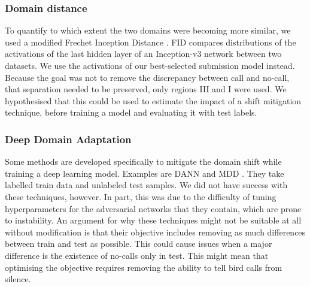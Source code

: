 \subsubsection{Domain distance}\label{sec:dist}
To quantify to which extent the two domains were becoming more similar, we used a modified Frechet Inception Distance \cite{heusel2018gans}. FID compares distributions of the activations of the last hidden layer of an Inception-v3 network between two datasets. We use the activations of our best-selected submission model instead. Because the goal was not to remove the discrepancy between call and no-call, that separation needed to be preserved, only regions III and I were used. We hypothesised that this could be used to estimate the impact of a shift mitigation technique, before training a model and evaluating it with test labels.

\subsubsection{Deep Domain Adaptation}
Some methods are developed specifically to mitigate the domain shift while training a deep learning model. Examples are DANN \cite{sicilia2022domain} and MDD \cite{Li_2021}. They take labelled train data and unlabeled test samples. We did not have success with these techniques, however. In part, this was due to the difficulty of tuning hyperparameters for the adversarial networks that they contain, which are prone to instability. An argument for why these techniques might not be suitable at all without modification is that their objective includes removing as much differences between train and test as possible. This could cause issues when a major difference is the existence of no-calls only in test. This might mean that optimising the objective requires removing the ability to tell bird calls from silence. 


